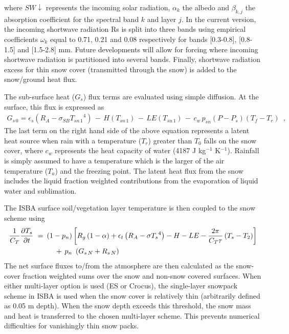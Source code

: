 %
where $SW\downarrow$ represents the incoming solar radiation, 
$\alpha_k$ the albedo and $\beta_{k,j}$ 
the absorption coefficient for the spectral band
$k$ and layer $j$. In the current version, the incoming shortwave
radiation Rs is split into three bands using empirical coefficients $\omega_k$
equal to 0.71, 0.21 and 0.08 respectively for bands [0.3-0.8], [0.8-1.5]
and [1.5-2.8] mm. Future developments will allow for forcing
where incoming shortwave radiation is partitioned into several
bands. Finally, shortwave radiation excess for thin snow cover (transmitted
through the snow) is added to the snow/ground heat flux.

The sub-surface heat ($G_s$) flux terms are evaluated using
simple diffusion. At the surface, this flux is expressed as
%
\begin{eqnarray}
G_{s\,0}
= \epsilon_s \left( R_A - \sigma_{SB} {T_{sn\,1}}^4 \right)
\,-\, H\left(T_{sn\,1}\right) \,-\, LE\left(T_{sn\,1}\right) \,-\,
c_w \,p_{sn} \left(P-P_s\right)\left(T_f-T_r\right)\,\,\,,
\end{eqnarray}
%
The last term on the right hand side of the above equation
represents a latent heat source when rain
with a temperature ($T_r$) greater than $T_0$ falls on the snow cover,
where $c_w$ represents the heat
capacity of water (4187 J kg$^{-1}$ K$^{-1}$).
Rainfall is simply assumed to have a temperature which is the larger of
the air temperature ($T_a$) and the freezing point.
The latent heat flux from the snow
includes the liquid fraction weighted
contributions from the
evaporation of liquid water and sublimation.

The ISBA surface soil/vegetation layer temperature is then
coupled to the snow scheme using
%
\begin{align}
\begin{split}
{1\over C_T}{\partial T_s\over\partial t} \,\, = &\,\, 
\left(1-p_n\right) 
\left[
R_g\left(1-\alpha\right) +
\epsilon_t\left(R_A-\sigma {T_s}^4\right)- H - LE
- {2\pi \over C_T \tau} \left(T_s-T_2\right)
\right] 
\\
%
& 
\hskip.2in
\,+\, p_n \,\, \left( G_{s\,N}+R_{s\,N}
\right)
\end{split}
\end{align}
%
The net surface fluxes to/from the atmosphere
are then calculated as the snow-cover
fraction weighted sums over the snow and non-snow covered
surfaces. When either multi-layer option is used (ES or Crocus), the single-layer snowpack scheme in ISBA 
is used when the snow cover is relatively thin (arbitrarily
defined as 0.05 m depth). When the snow depth exceeds this
threshold, the snow mass and heat is transferred to the chosen multi-layer
scheme. This prevents numerical difficulties
for vanishingly thin snow packs.


